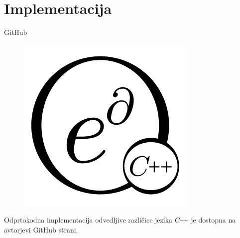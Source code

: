 \documentclass{beamer}
\newcommand{\CC}{C\nolinebreak\hspace{-.05em}\raisebox{.4ex}{\tiny\bf +}\nolinebreak\hspace{-.10em}\raisebox{.4ex}{\tiny\bf +}}
\def\CC{{C\nolinebreak[4]\hspace{-.05em}\raisebox{.4ex}{\tiny\bf ++}}}
\begin{document}
\section{Implementacija}
\begin{frame}{GitHub}
\begin{figure}[h]
\centering
\includegraphics[width=0.5\linewidth]{edCpplogo.png}
\end{figure}
Odprtokodna implementacija odvedljive različice jezika $\CC$ je dostopna na avtorjevi GitHub strani.
\end{frame}
\end{document}
